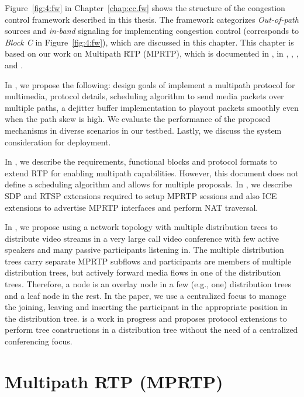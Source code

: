 Figure~\ref{fig:4:fw} in Chapter~\ref{chap:cc.fw} shows the structure of the
congestion control framework described in this thesis. The framework
categorizes \emph{Out-of-path} sources and \emph{in-band} signaling for
implementing congestion control (corresponds to \emph{Block C} in
Figure~\ref{fig:4:fw}), which are discussed in this chapter. This chapter is
based on our work on Multipath RTP (MPRTP), which is documented in
, in \cite{draft.mprtp}, \cite{draft.mprtp.sdp},
\cite{Globisch:AsymGrpComm}, and \cite{draft.rtcp.overlay}.

In , we propose the following: design goals of implement a
multipath protocol for multimedia, protocol details, scheduling algorithm to
send media packets over multiple paths, a dejitter buffer implementation to
playout packets smoothly even when the path skew is high. We evaluate the
performance of the proposed mechanisms in diverse scenarios in our testbed.
Lastly, we discuss the system consideration for deployment. 

In \cite{draft.mprtp}, we describe the requirements, functional blocks and
protocol formats to extend RTP for enabling multipath capabilities. However,
this document does not define a scheduling algorithm and allows for multiple
proposals. In \cite{draft.mprtp.sdp}, we describe SDP and RTSP extensions
required to setup MPRTP sessions and also ICE extensions to advertise MPRTP
interfaces and perform NAT traversal.

In \cite{Globisch:AsymGrpComm}, we propose using a network topology with
multiple distribution trees to distribute video streams in a very large call
video conference with few active speakers and many passive participants
listening in. The multiple distribution trees carry separate MPRTP subflows
and participants are members of multiple distribution trees, but actively
forward media flows in one of the distribution trees. Therefore, a node is an
overlay node in a few (e.g., one) distribution trees and a leaf node in the
rest. In the paper, we use a centralized focus to manage the joining, leaving
and inserting the participant in the appropriate position in the distribution
tree. \cite{draft.rtcp.overlay} is a work in progress and proposes protocol
extensions to perform tree constructions in a distribution tree without the
need of a centralized conferencing focus.


\section{Multipath RTP (MPRTP)}

